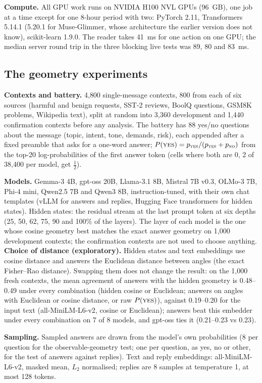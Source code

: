 \textbf{Compute.} All GPU work runs on NVIDIA H100 NVL GPUs (96~GB), one job at a time except for one 8-hour period with two: PyTorch 2.11, Transformers 5.14.1 (5.20.1 for Muse-Glimmer, whose architecture the earlier version does not know), scikit-learn 1.9.0. The reader takes 41~ms for one action on one GPU; the median server round trip in the three blocking live tests was 89, 80 and 83~ms.

\subsection{The geometry experiments}
\label{app:gdetails}
\textbf{Contexts and battery.} 4{,}800 single-message contexts, 800 from each of six sources (harmful and benign requests, SST-2 reviews, BoolQ questions, GSM8K problems, Wikipedia text), split at random into 3{,}360 development and 1{,}440 confirmation contexts before any analysis. The battery has 88 yes/no questions about the message (topic, intent, tone, demands, risk), each appended after a fixed preamble that asks for a one-word answer; $P(\textsc{yes})=p_{\textsc{yes}}/(p_{\textsc{yes}}+p_{\textsc{no}})$ from the top-20 log-probabilities of the first answer token (cells where both are $0$, 2 of 38{,}400 per model, get $\tfrac12$).

\textbf{Models.} Gemma-3 4B, gpt-oss 20B, Llama-3.1 8B, Mistral 7B v0.3, OLMo-3 7B, Phi-4 mini, Qwen2.5 7B and Qwen3 8B, instruction-tuned, with their own chat templates (vLLM for answers and replies, Hugging Face transformers for hidden states). Hidden states: the residual stream at the last prompt token at six depths (25, 50, 62, 75, 90 and 100\% of the layers). The layer of each model is the one whose cosine geometry best matches the exact answer geometry on 1{,}000 development contexts; the confirmation contexts are not used to choose anything. \textbf{Choice of distance (exploratory).} Hidden states and text embeddings use cosine distance and answers the Euclidean distance between angles (the exact Fisher--Rao distance). Swapping them does not change the result: on the 1{,}000 fresh contexts, the mean agreement of answers with the hidden geometry is 0.48--0.49 under every combination (hidden cosine or Euclidean; answers on angles with Euclidean or cosine distance, or raw $P(\textsc{yes})$), against 0.19--0.20 for the input text (all-MiniLM-L6-v2, cosine or Euclidean); answers beat this embedder under every combination on 7 of 8 models, and gpt-oss ties it (0.21--0.23 vs 0.23).

\textbf{Sampling.} Sampled answers are drawn from the model's own probabilities (8 per question for the observable-geometry test; one per question, as yes, no or other, for the test of answers against replies). Text and reply embeddings: all-MiniLM-L6-v2, masked mean, $L_2$ normalised; replies are 8 samples at temperature 1, at most 128 tokens.

